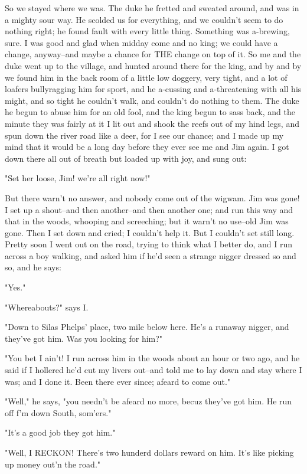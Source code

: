 So we stayed where we was.  The duke he fretted and sweated around, and
was in a mighty sour way.  He scolded us for everything, and we couldn't
seem to do nothing right; he found fault with every little thing.
Something was a-brewing, sure.  I was good and glad when midday come and
no king; we could have a change, anyway--and maybe a chance for THE
change on top of it.  So me and the duke went up to the village, and
hunted around there for the king, and by and by we found him in the back
room of a little low doggery, very tight, and a lot of loafers
bullyragging him for sport, and he a-cussing and a-threatening with all
his might, and so tight he couldn't walk, and couldn't do nothing to
them.  The duke he begun to abuse him for an old fool, and the king begun
to sass back, and the minute they was fairly at it I lit out and shook
the reefs out of my hind legs, and spun down the river road like a deer,
for I see our chance; and I made up my mind that it would be a long day
before they ever see me and Jim again.  I got down there all out of
breath but loaded up with joy, and sung out:

"Set her loose, Jim! we're all right now!"

But there warn't no answer, and nobody come out of the wigwam.  Jim was
gone!  I set up a shout--and then another--and then another one; and run
this way and that in the woods, whooping and screeching; but it warn't no
use--old Jim was gone.  Then I set down and cried; I couldn't help it.
But I couldn't set still long.  Pretty soon I went out on the road,
trying to think what I better do, and I run across a boy walking, and
asked him if he'd seen a strange nigger dressed so and so, and he says:

"Yes."

"Whereabouts?" says I.

"Down to Silas Phelps' place, two mile below here.  He's a runaway
nigger, and they've got him.  Was you looking for him?"

"You bet I ain't!  I run across him in the woods about an hour or two
ago, and he said if I hollered he'd cut my livers out--and told me to lay
down and stay where I was; and I done it.  Been there ever since; afeard
to come out."

"Well," he says, "you needn't be afeard no more, becuz they've got him.
He run off f'm down South, som'ers."

"It's a good job they got him."

"Well, I RECKON!  There's two hunderd dollars reward on him.  It's like
picking up money out'n the road."

